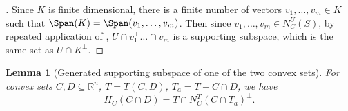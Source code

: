 \documentclass{article}
\theoremstyle{plain}
\newtheorem{lemma}{Lemma}[section]
\theoremstyle{definition}
\theoremstyle{remark}
\begin{document}
\begin{proof}[\hypertarget{loc:conical_projections_yield_supporting_subspaces.proof}Proof of \Cref{loc:conical_projections_yield_supporting_subspaces.statement}]

Since $K$ is finite dimensional, there is a finite number of vectors $v_1, \ldots, v_m \in K$
such that $\Span(K) = \Span(v_1, \ldots, v_m)$.
Then since $v_1, \ldots , v_m \in N_C^U(S)$, by repeated application of
, $U \cap v_1^\perp \ldots \cap v_m^\perp$ is a supporting subspace, which is the same set as $U \cap K^\perp$.
\end{proof}
\begin{lemma}[Generated supporting subspace of one of the two convex sets]
\label{loc:generated_supporting_subspace_of_one_of_the_two_convex_sets.statement}
For convex sets $C, D \subseteq \mathbb{R}^n$, $T=T(C,D)$, $T_a = T + C  \cap D$, we have
\begin{equation*}
H_C(C \cap D) = T \cap N_C^T(C \cap T_a)^\perp.
\end{equation*}
\end{lemma}
\end{document}
